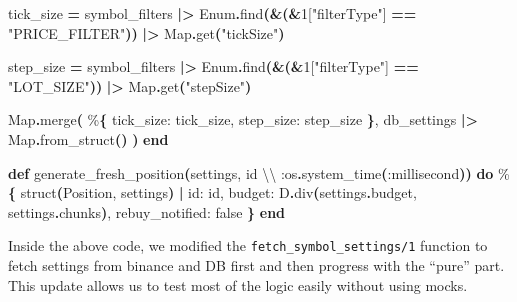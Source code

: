 \documentclass[
  oneside]{book}
\newenvironment{Shaded}{\begin{snugshade}}{\end{snugshade}}
\newcommand{\ConstantTok}[1]{\textcolor[rgb]{0.56,0.35,0.01}{#1}}
\newcommand{\DecValTok}[1]{\textcolor[rgb]{0.00,0.00,0.81}{#1}}
\newcommand{\FunctionTok}[1]{\textcolor[rgb]{0.13,0.29,0.53}{\textbf{#1}}}
\newcommand{\KeywordTok}[1]{\textcolor[rgb]{0.13,0.29,0.53}{\textbf{#1}}}
\newcommand{\NormalTok}[1]{#1}
\newcommand{\OperatorTok}[1]{\textcolor[rgb]{0.81,0.36,0.00}{\textbf{#1}}}
\newcommand{\OtherTok}[1]{\textcolor[rgb]{0.56,0.35,0.01}{#1}}
\newcommand{\StringTok}[1]{\textcolor[rgb]{0.31,0.60,0.02}{#1}}
\newcommand{\VariableTok}[1]{\textcolor[rgb]{0.00,0.00,0.00}{#1}}
\begin{document}
\begin{Shaded}
\begin{Highlighting}[]
\NormalTok{    tick\_size }\OperatorTok{=}
\NormalTok{      symbol\_filters}
      \OperatorTok{|\textgreater{}} \ConstantTok{Enum}\OperatorTok{.}\NormalTok{find}\FunctionTok{(}\OperatorTok{\&}\FunctionTok{(}\OperatorTok{\&}\DecValTok{1}\OtherTok{[}\StringTok{"filterType"}\OtherTok{]} \OperatorTok{==} \StringTok{"PRICE\_FILTER"}\FunctionTok{))}
      \OperatorTok{|\textgreater{}} \ConstantTok{Map}\OperatorTok{.}\NormalTok{get}\FunctionTok{(}\StringTok{"tickSize"}\FunctionTok{)}

\NormalTok{    step\_size }\OperatorTok{=}
\NormalTok{      symbol\_filters}
      \OperatorTok{|\textgreater{}} \ConstantTok{Enum}\OperatorTok{.}\NormalTok{find}\FunctionTok{(}\OperatorTok{\&}\FunctionTok{(}\OperatorTok{\&}\DecValTok{1}\OtherTok{[}\StringTok{"filterType"}\OtherTok{]} \OperatorTok{==} \StringTok{"LOT\_SIZE"}\FunctionTok{))}
      \OperatorTok{|\textgreater{}} \ConstantTok{Map}\OperatorTok{.}\NormalTok{get}\FunctionTok{(}\StringTok{"stepSize"}\FunctionTok{)}

    \ConstantTok{Map}\OperatorTok{.}\NormalTok{merge}\FunctionTok{(}
\NormalTok{      \%}\FunctionTok{\{}
        \VariableTok{tick\_size:}\NormalTok{ tick\_size,}
        \VariableTok{step\_size:}\NormalTok{ step\_size}
      \FunctionTok{\}}\NormalTok{,}
\NormalTok{      db\_settings }\OperatorTok{|\textgreater{}} \ConstantTok{Map}\OperatorTok{.}\NormalTok{from\_struct}\FunctionTok{()}
    \FunctionTok{)}
  \KeywordTok{end}

  \KeywordTok{def}\NormalTok{ generate\_fresh\_position}\FunctionTok{(}\NormalTok{settings, id \textbackslash{}\textbackslash{} }\VariableTok{:os}\OperatorTok{.}\NormalTok{system\_time}\FunctionTok{(}\VariableTok{:millisecond}\FunctionTok{))} \KeywordTok{do}
\NormalTok{    \%}\FunctionTok{\{}
\NormalTok{      struct}\FunctionTok{(}\ConstantTok{Position}\NormalTok{, settings}\FunctionTok{)}
      \OperatorTok{|} \VariableTok{id:}\NormalTok{ id,}
        \VariableTok{budget:}\NormalTok{ D}\OperatorTok{.}\NormalTok{div}\FunctionTok{(}\NormalTok{settings}\OperatorTok{.}\NormalTok{budget, settings}\OperatorTok{.}\NormalTok{chunks}\FunctionTok{)}\NormalTok{,}
        \VariableTok{rebuy\_notified:} \ConstantTok{false}
    \FunctionTok{\}}
  \KeywordTok{end}
\end{Highlighting}
\end{Shaded}

Inside the above code, we modified the \texttt{fetch\_symbol\_settings/1} function to fetch settings from binance and DB first and then progress with the ``pure'' part. This update allows us to test most of the logic easily without using mocks.
\end{document}
